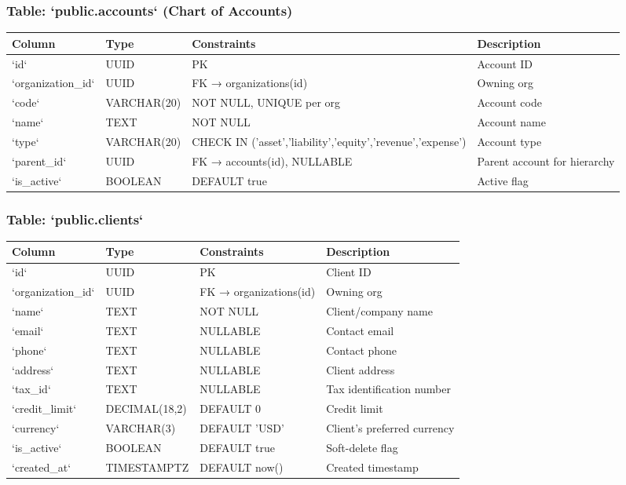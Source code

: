 \documentclass[journal, a4paper, onecolumn, 12pt]{IEEEtran}
\begin{document}
\subsubsection{Table: `public.accounts` (Chart of Accounts)}
\begin{longtable}{|p{}|p{}|p{}|p{}|}
\hline
Column & Type & Constraints & Description \\ \hline
\hline
`id` & UUID & PK & Account ID \\ \hline
`organization\_id` & UUID & FK → organizations(id) & Owning org \\ \hline
`code` & VARCHAR(20) & NOT NULL, UNIQUE per org & Account code \\ \hline
`name` & TEXT & NOT NULL & Account name \\ \hline
`type` & VARCHAR(20) & CHECK IN ('asset','liability','equity','revenue','expense') & Account type \\ \hline
`parent\_id` & UUID & FK → accounts(id), NULLABLE & Parent account for hierarchy \\ \hline
`is\_active` & BOOLEAN & DEFAULT true & Active flag \\ \hline
\end{longtable}
\subsubsection{Table: `public.clients`}
\begin{longtable}{|p{}|p{}|p{}|p{}|}
\hline
Column & Type & Constraints & Description \\ \hline
\hline
`id` & UUID & PK & Client ID \\ \hline
`organization\_id` & UUID & FK → organizations(id) & Owning org \\ \hline
`name` & TEXT & NOT NULL & Client/company name \\ \hline
`email` & TEXT & NULLABLE & Contact email \\ \hline
`phone` & TEXT & NULLABLE & Contact phone \\ \hline
`address` & TEXT & NULLABLE & Client address \\ \hline
`tax\_id` & TEXT & NULLABLE & Tax identification number \\ \hline
`credit\_limit` & DECIMAL(18,2) & DEFAULT 0 & Credit limit \\ \hline
`currency` & VARCHAR(3) & DEFAULT 'USD' & Client's preferred currency \\ \hline
`is\_active` & BOOLEAN & DEFAULT true & Soft-delete flag \\ \hline
`created\_at` & TIMESTAMPTZ & DEFAULT now() & Created timestamp \\ \hline
\end{longtable}
\end{document}
